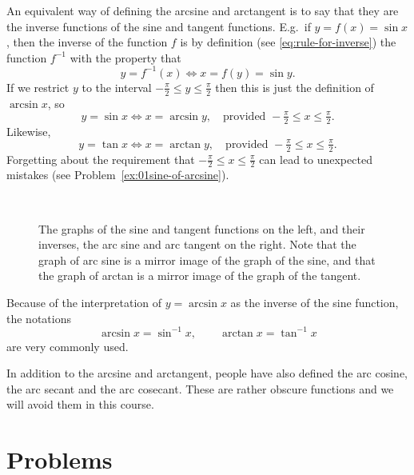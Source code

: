An equivalent way of defining the arcsine and arctangent is to say
that they are the inverse functions of the sine and tangent functions.
E.g.~if $y=f(x) = \sin x$, then the inverse of the function $f$ is by
definition (see \eqref{eq:rule-for-inverse}) the function $f^{-1}$
with the property that
\[
 y =f^{-1}(x) \iff x = f(y) = \sin y.
\]
If we restrict $y$ to the interval $-\frac\pi2\leq y \leq \frac\pi2$
then this is just the definition of $\arcsin x$, so
\[
y =\sin x \iff x=\arcsin y, \quad
\text{provided } -\tfrac\pi2 \leq x\leq \tfrac \pi2.
\]
Likewise,
\[
y =\tan x \iff x=\arctan y, \quad
\text{provided } -\tfrac\pi2 \leq x\leq \tfrac \pi2.
\]
Forgetting about the requirement that $-\frac\pi2 \leq x\leq \frac
\pi2$ can lead to unexpected mistakes (see
Problem~\ref{ex:01sine-of-arcsine}).

\begin{figure}[t]
  \begin{center}
    \parbox{0.6\textwidth}{}%
    \parbox{0.38\textwidth}{}\\
    \parbox{0.6\textwidth}{}%
    \parbox{0.38\textwidth}{}
  \end{center}
  \caption{The graphs of the sine and tangent functions on the left,
    and their inverses, the arc sine and arc tangent on the right.
    Note that the graph of arc sine is a mirror image of the graph of
    the sine, and that the graph of arctan is a mirror image of the
    graph of the tangent.  }
  \label{fig:01sine-and-arcsine}
\end{figure}%


Because of the interpretation of $y=\arcsin x$ as the inverse of the
sine function, the notations
\[
\arcsin x = \sin^{-1} x,\qquad
\arctan x = \tan^{-1} x
\]
are very commonly used.

In addition to the arcsine and arctangent, people have also defined
the arc cosine, the arc secant and the arc cosecant.  These are rather
obscure functions and we will avoid them in this course.

\newpage

\section{Problems}
\problemfont%

